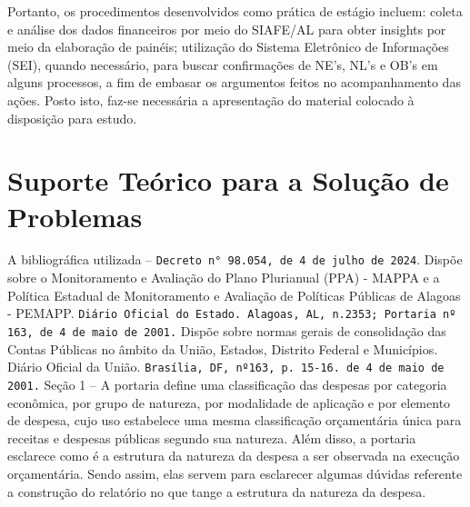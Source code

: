 \documentclass[12pt,a4paper]{article}
\begin{document}
	Portanto, os procedimentos desenvolvidos como prática de estágio incluem: coleta e análise dos dados financeiros por meio do SIAFE/AL 
	para obter insights por meio da elaboração de painéis; utilização do Sistema Eletrônico de Informações (SEI), quando necessário, 
 	para buscar confirmações de NE’s, NL’s e OB’s em alguns processos, a fim de embasar os argumentos feitos no acompanhamento das ações.
 	Posto isto, faz-se necessária a apresentação do material colocado à disposição para estudo.


	\section{Suporte Teórico para a Solução de Problemas}
	\hspace*{1,5cm}A bibliográfica utilizada – \texttt{Decreto n° 98.054, de 4 de julho de 2024}. Dispõe sobre o 
	Monitoramento e Avaliação do Plano Plurianual (PPA) - MAPPA e a Política Estadual de 
	Monitoramento e Avaliação de Políticas Públicas de Alagoas - PEMAPP. \texttt{Diário Oficial do 
	Estado. Alagoas, AL, n.2353; Portaria nº 163, de 4 de maio de 2001.} Dispõe sobre normas 
	gerais de consolidação das Contas Públicas no âmbito da União, Estados, Distrito Federal e 
	Municípios. Diário Oficial da União. \texttt{Brasília, DF, nº163, p. 15-16. de 4 de maio de 2001.} 
	Seção 1 – A portaria define uma classificação das despesas por categoria econômica, por grupo 
	de natureza, por modalidade de aplicação e por elemento de despesa, cujo uso estabelece uma 
	mesma classificação orçamentária única para receitas e despesas públicas segundo sua natureza. 
	Além disso, a portaria esclarece como é a estrutura da natureza da despesa a ser observada na 
	execução orçamentária. Sendo assim, elas servem para esclarecer algumas dúvidas referente a 
	construção do relatório no que tange a estrutura da natureza da despesa. %
	
\end{document}
